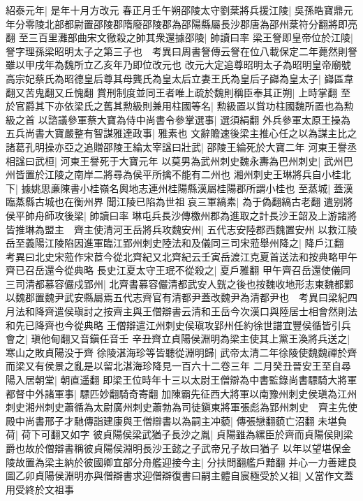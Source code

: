 紹泰元年|{
	是年十月方改元}
春正月壬午朔邵陵太守劉棻將兵援江陵|{
	吳孫皓寶鼎元年分零陵北部都尉置邵陵郡隋廢邵陵郡為邵陽縣屬長沙郡唐為邵州棻符分翻將即亮翻}
至三百里灘部曲宋文徹殺之帥其衆還據邵陵|{
	帥讀曰率}
梁王詧即皇帝位於江陵|{
	詧字理孫梁昭明太子之第三子也　考異曰周書詧傳云詧在位八載保定二年薨然則詧雖以甲戌年為魏所立乙亥年乃即位改元也}
改元大定追尊昭明太子為昭明皇帝廟號高宗妃蔡氏為昭德皇后尊其母龔氏為皇太后立妻王氏為皇后子巋為皇太子|{
	巋區韋翻又苦鬼翻又丘愧翻}
賞刑制度並同王者唯上疏於魏則稱臣奉其正朔|{
	上時掌翻}
至於官爵其下亦依梁氏之舊其勲級則兼用柱國等名|{
	勲級置以賞功柱國魏所置也為勲級之首}
以諮議參軍蔡大寶為侍中尚書令參掌選事|{
	選須絹翻}
外兵參軍太原王操為五兵尚書大寶嚴整有智謀雅達政事|{
	雅素也}
文辭贍速後梁主推心任之以為謀主比之諸葛孔明操亦亞之追贈邵陵王綸太宰諡曰壯武|{
	邵陵王綸死於大寶二年}
河東王譽丞相諡曰武桓|{
	河東王譽死于大寶元年}
以莫男為武州刺史魏永夀為巴州刺史|{
	武州巴州皆置於江陵之南岸二將尋為侯平所擒不能有二州也}
湘州刺史王琳將兵自小桂北下|{
	據姚思亷陳書小桂嶺名輿地志連州桂陽縣漢屬桂陽郡所謂小桂也}
至蒸城|{
	蓋漢臨蒸縣古城也在衡州界}
聞江陵已陷為世祖哀三軍縞素|{
	為于偽翻縞古老翻}
遣别將侯平帥舟師攻後梁|{
	帥讀曰率}
琳屯兵長沙傳檄州郡為進取之計長沙王韶及上游諸將皆推琳為盟主　齊主使清河王岳將兵攻魏安州|{
	五代志安陸郡西魏置安州}
以救江陵岳至義陽江陵陷因進軍臨江郢州刺史陸法和及儀同三司宋蒞舉州降之|{
	降戶江翻　考異曰北史宋蒞作宋茝今從北齊紀又北齊紀云壬寅岳渡江克夏首送法和按典略甲午齊已召岳還今從典略}
長史江夏太守王珉不從殺之|{
	夏戶雅翻}
甲午齊召岳還使儀同三司清都慕容儼戍郢州|{
	北齊書慕容儼清都武安人皝之後也按魏收地形志東魏都鄴以魏郡置魏尹武安縣屬焉五代志齊官有清都尹蓋改魏尹為清都尹也　考異曰梁紀四月法和降齊遣侯瑱討之按齊主與王僧辯書云清和王岳今次漢口與陸居士相會然則法和先已降齊也今從典略}
王僧辯遣江州刺史侯瑱攻郢州任約徐世譜宜豐侯循皆引兵會之|{
	瑱他甸翻又音鎭任音壬}
辛丑齊立貞陽侯淵明為梁主使其上黨王渙將兵送之|{
	寒山之敗貞陽没于齊}
徐陵湛海珍等皆聽從淵明歸|{
	武帝太清二年徐陵使魏魏禪於齊而梁又有侯景之亂是以留北湛海珍降見一百六十二卷三年}
二月癸丑晉安王至自尋陽入居朝堂|{
	朝直遥翻}
即梁王位時年十三以太尉王僧辯為中書監錄尚書驃騎大將軍都督中外諸軍事|{
	驃匹妙翻騎奇寄翻}
加陳霸先征西大將軍以南豫州刺史侯瑱為江州刺史湘州刺史蕭循為太尉廣州刺史蕭勃為司徒鎭東將軍張彪為郢州刺史　齊主先使殿中尚書邢子才馳傳詣建康與王僧辯書以為嗣主冲藐|{
	傳張戀翻藐亡沼翻}
未堪負荷|{
	荷下可翻又如字}
彼貞陽侯梁武猶子長沙之胤|{
	貞陽雖為縲臣於齊而貞陽侯則梁爵也故於僧辯書稱彼貞陽侯淵明長沙王懿之子武帝兄子故曰猶子}
以年以望堪保金陵故置為梁主納於彼國卿宜部分舟艦迎接今主|{
	分扶問翻艦戶黯翻}
并心一力善建良圖乙卯貞陽侯淵明亦與僧辯書求迎僧辯復書曰嗣主體自宸極受於乂祖|{
	乂當作文蓋用受終於文祖事}
